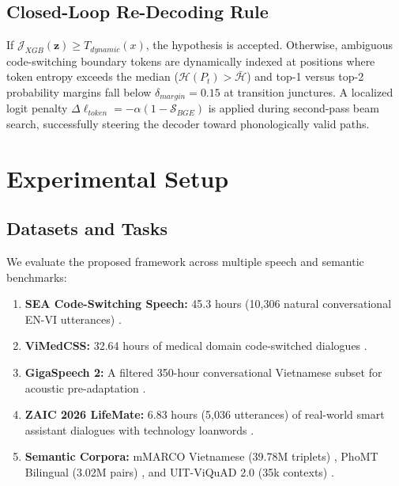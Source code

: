 \documentclass[9pt, conference, a4paper, compsocconf]{IEEEtran}
\begin{document}
\subsection{Closed-Loop Re-Decoding Rule}
If $\mathcal{J}_{XGB}(\mathbf{z}) \ge T_{dynamic}(x)$, the hypothesis is accepted. Otherwise, ambiguous code-switching boundary tokens are dynamically indexed at positions where token entropy exceeds the median ($\mathcal{H}(P_t) > \bar{\mathcal{H}}$) and top-1 versus top-2 probability margins fall below $\delta_{margin} = 0.15$ at transition junctures. A localized logit penalty $\Delta \ell_{token} = -\alpha (1 - \mathcal{S}_{BGE})$ is applied during second-pass beam search, successfully steering the decoder toward phonologically valid paths.

\section{Experimental Setup}

\subsection{Datasets and Tasks}
We evaluate the proposed framework across multiple speech and semantic benchmarks:
\begin{enumerate}
    \item \textbf{SEA Code-Switching Speech:} 45.3 hours (10,306 natural conversational EN-VI utterances) \cite{shen2023sea}.
    \item \textbf{ViMedCSS:} 32.64 hours of medical domain code-switched dialogues \cite{nguyen2024vimedcss}.
    \item \textbf{GigaSpeech 2:} A filtered 350-hour conversational Vietnamese subset for acoustic pre-adaptation \cite{gu2024gigaspeech}.
    \item \textbf{ZAIC 2026 LifeMate:} 6.83 hours (5,036 utterances) of real-world smart assistant dialogues with technology loanwords \cite{zaic2026lifemate}.
    \item \textbf{Semantic Corpora:} mMARCO Vietnamese (39.78M triplets) \cite{bonifacio2021mmarco}, PhoMT Bilingual (3.02M pairs) \cite{nguyen2021phomt}, and UIT-ViQuAD 2.0 (35k contexts) \cite{nguyen2020uit}.
\end{enumerate}
\end{document}

